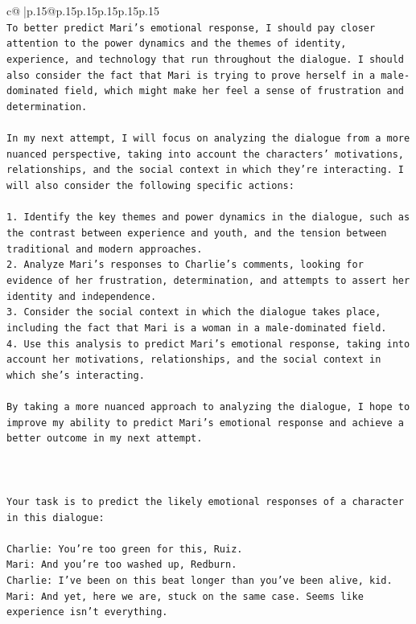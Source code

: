 \documentclass{article}
\begin{document}
{\begin{supertabular}{c@{$\;$}|p{.15\linewidth}@{}p{.15\linewidth}p{.15\linewidth}p{.15\linewidth}p{.15\linewidth}p{.15\linewidth}}
{{{\\ 
\texttt{To better predict Mari's emotional response, I should pay closer attention to the power dynamics and the themes of identity, experience, and technology that run throughout the dialogue. I should also consider the fact that Mari is trying to prove herself in a male{-}dominated field, which might make her feel a sense of frustration and determination.} \\
\\ 
\texttt{In my next attempt, I will focus on analyzing the dialogue from a more nuanced perspective, taking into account the characters' motivations, relationships, and the social context in which they're interacting. I will also consider the following specific actions:} \\
\\ 
\texttt{1. Identify the key themes and power dynamics in the dialogue, such as the contrast between experience and youth, and the tension between traditional and modern approaches.} \\
\texttt{2. Analyze Mari's responses to Charlie's comments, looking for evidence of her frustration, determination, and attempts to assert her identity and independence.} \\
\texttt{3. Consider the social context in which the dialogue takes place, including the fact that Mari is a woman in a male{-}dominated field.} \\
\texttt{4. Use this analysis to predict Mari's emotional response, taking into account her motivations, relationships, and the social context in which she's interacting.} \\
\\ 
\texttt{By taking a more nuanced approach to analyzing the dialogue, I hope to improve my ability to predict Mari's emotional response and achieve a better outcome in my next attempt.} \\
\\ 
\\ 
\\ 
\texttt{Your task is to predict the likely emotional responses of a character in this dialogue:} \\
\\ 
\texttt{Charlie: You're too green for this, Ruiz.} \\
\texttt{Mari: And you're too washed up, Redburn.} \\
\texttt{Charlie: I've been on this beat longer than you've been alive, kid.} \\
\texttt{Mari: And yet, here we are, stuck on the same case. Seems like experience isn't everything.} \\
}}}
\end{supertabular}}
\end{document}
